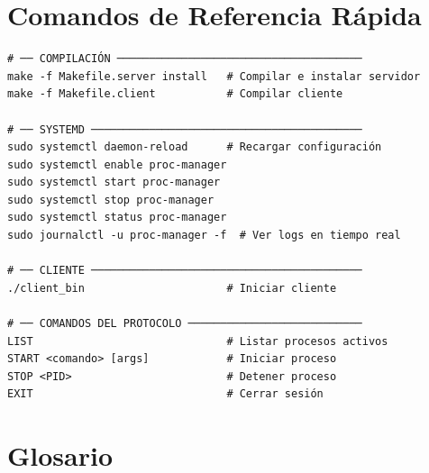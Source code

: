 \documentclass[12pt,a4paper]{report}
\begin{document}
\appendix

\chapter{Comandos de Referencia Rápida}

\begin{tcolorbox}[colback=grisClaro, colframe=azulTitulo,
                  title=\textbf{Resumen de Comandos del Sistema}]
\begin{lstlisting}[style=bashstyle, numbers=none]
# ── COMPILACIÓN ──────────────────────────────────────
make -f Makefile.server install   # Compilar e instalar servidor
make -f Makefile.client           # Compilar cliente

# ── SYSTEMD ──────────────────────────────────────────
sudo systemctl daemon-reload      # Recargar configuración
sudo systemctl enable proc-manager
sudo systemctl start proc-manager
sudo systemctl stop proc-manager
sudo systemctl status proc-manager
sudo journalctl -u proc-manager -f  # Ver logs en tiempo real

# ── CLIENTE ──────────────────────────────────────────
./client_bin                      # Iniciar cliente

# ── COMANDOS DEL PROTOCOLO ───────────────────────────
LIST                              # Listar procesos activos
START <comando> [args]            # Iniciar proceso
STOP <PID>                        # Detener proceso
EXIT                              # Cerrar sesión
\end{lstlisting}
\end{tcolorbox}

\chapter{Glosario}
\end{document}
